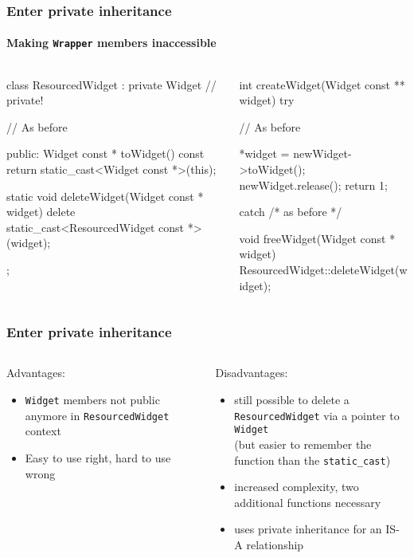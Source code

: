 \documentclass{beamer}
\def\code#1{\texttt{#1}}
\def\titleinframe#1{{\usebeamercolor[fg]{structure} #1}}
\begin{document}
\begin{frame}[fragile]
\frametitle{Enter private inheritance}
\framesubtitle{Making \code{Wrapper} members inaccessible}
\pause
\begin{columns}
\begin{column}{0.45\textwidth}
\begin{TinyC++}
class ResourcedWidget : private Widget // private!
{
	// As before

public:	
	Widget const * toWidget() const
	{
		return static_cast<Widget const *>(this);
	}
	
	static void deleteWidget(Widget const * widget)
	{
		delete static_cast<ResourcedWidget const *>(widget);
	}
};
\end{TinyC++}
\end{column}
\pause
\begin{column}{0.45\textwidth}
\begin{TinyC++}
int createWidget(Widget const ** widget)
try
{
	// As before
    
	*widget = newWidget->toWidget();
	newWidget.release();
	return 1;
}
catch /* as before */
\end{TinyC++}

\begin{TinyC++}
void freeWidget(Widget const * widget)
{
	ResourcedWidget::deleteWidget(widget);
}
\end{TinyC++}
\end{column}
\end{columns}
\end{frame}


\begin{frame}[fragile]
\frametitle{Enter private inheritance}
\begin{columns}[T]
\begin{column}{0.45\textwidth}
	\titleinframe{Advantages:}
	
	\medskip
	\begin{itemize}
	\item \code{Widget} members not public anymore in \code{ResourcedWidget} context
	\item Easy to use right, hard to use wrong
	\end{itemize}
\end{column}
\pause
\begin{column}{0.45\textwidth}
	\titleinframe{Disadvantages:}
	
	\medskip
	\begin{itemize}
	\item still possible to delete a \code{ResourcedWidget} via a pointer to \code{Widget} \\ (but easier to remember the function than the \code{static\_cast})
	\item increased complexity, two additional functions necessary
	\item uses private inheritance for an IS-A relationship
	\end{itemize}
\end{column}
\end{columns}
\end{frame}
\end{document}
